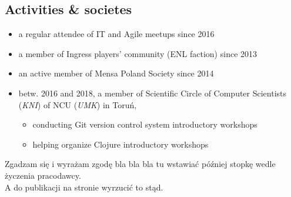\documentclass[a4paper]{res}
\begin{document}
\begin{resume}
    \section{Activities \& societes}
        \vspace{0.14in}
    \begin{itemize}
        \item a regular attendee of IT and Agile meetups since 2016
        \vspace{-0.07in}
        \item a member of Ingress players' community (ENL faction) since 2013
        \vspace{-0.07in}
        \item an active member of Mensa Poland Society since 2014
        \vspace{-0.05in}
        \item \footnotesize betw. 2016 and 2018, a member of {Scientific Circle of Computer Scientists (\textsl{KNI})
        of NCU (\textsl{UMK}) in Toruń},
        \vspace{-0.07in}
        \begin{itemize}
        \vspace{-0.01in}
            \item conducting Git version control system introductory workshops
        \vspace{-0.05in}
            \item helping organize Clojure introductory workshops
        \end{itemize}
    \end{itemize}
\end{resume}
\vspace{-0.15in}
\begin{center}
    \noindent\makebox[\dimexpr\linewidth]{\rule{\dimexpr\paperwidth-3in}{0.4pt}}
    \footnotesize
    Zgadzam się i wyrażam zgodę bla bla bla tu wstawiać później stopkę wedle życzenia pracodawcy.\\
    A do publikacji na stronie wyrzucić to stąd.
\end{center}
\end{document}
